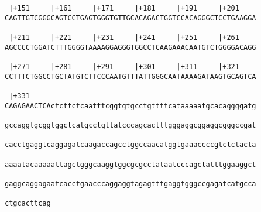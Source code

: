 \documentclass{article}
\begin{document}
\begin{Verbatim}
 |+151     |+161     |+171     |+181     |+191     |+201    
CAGTTGTCGGGCAGTCCTGAGTGGGTGTTGCACAGACTGGTCCACAGGGCTCCTGAAGGA
                                                            
 |+211     |+221     |+231     |+241     |+251     |+261    
AGCCCCTGGATCTTTGGGGTAAAAGGAGGGTGGCCTCAAGAAACAATGTCTGGGGACAGG
                                                            
 |+271     |+281     |+291     |+301     |+311     |+321    
CCTTTCTGGCCTGCTATGTCTTCCCAATGTTTATTGGGCAATAAAAGATAAGTGCAGTCA
                                                            
 |+331                                                      
CAGAGAACTCActcttctcaatttcggtgtgcctgttttcataaaaatgcacaggggatg
                                                            
gccaggtgcggtggctcatgcctgttatcccagcactttgggaggcggaggcgggccgat
                                                            
cacctgaggtcaggagatcaagaccagcctggccaacatggtgaaaccccgtctctacta
                                                            
aaaatacaaaaattagctgggcaaggtggcgcgcctataatcccagctatttggaaggct
                                                            
gaggcaggagaatcacctgaacccaggaggtagagtttgaggtgggccgagatcatgcca
                                                            
ctgcacttcag
           
           
\end{Verbatim}
\end{document}
